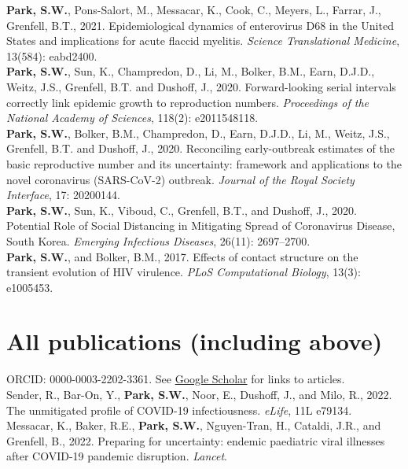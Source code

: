 \documentclass[11pt]{article} %
\begin{document}
 \textbf{Park, S.W.}, Pons-Salort, M., Messacar, K., Cook, C., Meyers, L., Farrar, J., Grenfell, B.T., 2021. Epidemiological dynamics of enterovirus D68 in the United States and implications for acute flaccid myelitis. \textit{Science Translational Medicine}, 13(584): eabd2400.\\

 \textbf{Park, S.W.}, Sun, K., Champredon, D., Li, M., Bolker, B.M., Earn, D.J.D., Weitz, J.S., Grenfell, B.T. and Dushoff, J., 2020. Forward-looking serial intervals correctly link epidemic growth to reproduction numbers. \textit{Proceedings of the National Academy of Sciences}, 118(2): e2011548118.\\

 \textbf{Park, S.W.}, Bolker, B.M., Champredon, D., Earn, D.J.D., Li, M., Weitz, J.S., Grenfell, B.T. and Dushoff, J., 2020. Reconciling early-outbreak estimates of the basic reproductive number and its uncertainty: framework and applications to the novel coronavirus (SARS-CoV-2) outbreak. \textit{Journal of the Royal Society Interface}, 17: 20200144.\\

 \textbf{Park, S.W.}, Sun, K., Viboud, C., Grenfell, B.T., and Dushoff, J., 2020. Potential Role of Social Distancing in Mitigating Spread of Coronavirus Disease, South Korea. \textit{Emerging Infectious Diseases}, 26(11): 2697–2700.\\

 \textbf{Park, S.W.}, and Bolker, B.M., 2017. Effects of contact structure on the transient
evolution of HIV virulence. \textit{PLoS Computational Biology}, 13(3): e1005453.\\

\section*{All publications (including above)}

ORCID: 0000-0003-2202-3361. See \href{https://scholar.google.com/citations?user=ZSCrs78AAAAJ&hl=en&oi=ao}{Google Scholar} for links to articles.\\

 Sender, R., Bar-On, Y., \textbf{Park, S.W.}, Noor, E., Dushoff, J., and Milo, R., 2022. The unmitigated profile of COVID-19 infectiousness. \textit{eLife}, 11L e79134.\\

 Messacar, K., Baker, R.E., \textbf{Park, S.W.}, Nguyen-Tran, H., Cataldi, J.R., and Grenfell, B., 2022. Preparing for uncertainty: endemic paediatric viral illnesses after COVID-19 pandemic disruption. \textit{Lancet}.\\
\end{document}
